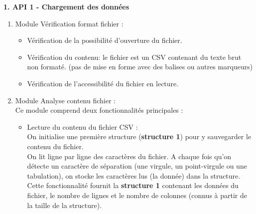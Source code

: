 		\begin{description}[style=unboxed,leftmargin=0.2cm]
		
			\item\textbf{1. API 1 - Chargement des données}
			\begin{enumerate}
			
				\item Module Vérification format fichier :\\
				\begin{itemize}
					\item Vérification de la possibilité d'ouverture du fichier.
					\item Vérification du contenu:  le fichier est un CSV contenant du texte brut non formaté. (pas de mise en forme avec des balises ou autres marqueurs)
					\item Vérification de l'accessibilité du fichier en lecture.
				\end{itemize}
			
				\item Module Analyse contenu fichier :\\
				Ce module comprend deux fonctionnalités principales :
				\begin{itemize}
					\item Lecture du contenu du fichier CSV :\\
					On initialise une première structure (\textbf{structure 1}) pour y sauvegarder le contenu du fichier.\\
					On lit ligne par ligne des caractères du fichier. A chaque fois qu'on détecte un caractère de séparation (une virgule, un point-virgule ou une tabulation), on stocke les caractères lus (la donnée) dans la structure.\\
					Cette fonctionnalité fournit la \textbf{structure 1} contenant les données du fichier, le nombre de lignes et le nombre de colonnes (connus à partir de la taille de la structure).\\
					

\end{itemize}
\end{enumerate}
\end{description}
